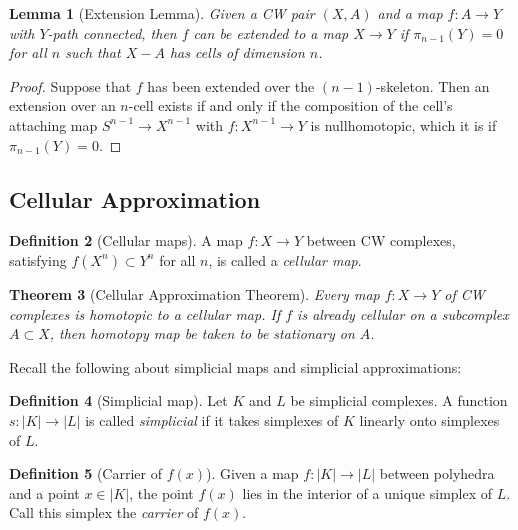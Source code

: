 \documentclass[reqno]{amsart}
\newtheorem{theorem}{Theorem}[section]
\newtheorem{lemma}[theorem]{Lemma}
\theoremstyle{definition}
\newtheorem{definition}[theorem]{Definition}
\theoremstyle{remark}
\begin{document}
\begin{lemma}[Extension Lemma]\label{Extension-Lemma}
    Given a CW pair $\left( X,A \right) $ and a map
    $f \colon A \to Y$ with $Y$-path connected,
    then $f$ can be extended to a map
    $X \to Y$ if $\pi_{n-1}(Y) = 0$ for all $n$ such that
    $X -A$ has cells of dimension $n$.
\end{lemma}

\begin{proof}
    Suppose that $f$ has been extended over the
    $\left( n-1 \right) $-skeleton. Then an extension
    over an $n$-cell exists if and only if
    the composition of the cell's attaching
    map $S^{n-1} \to X^{n-1}$ with $f
    \colon X^{n-1} \to Y$ is nullhomotopic, which
    it is if $\pi_{n-1} (Y) = 0$.
\end{proof}

\subsection{Cellular Approximation}

\begin{definition}[Cellular maps]
    A map $f \colon X \to Y$ between CW complexes,
    satisfying
    $f(X^{n}) \subset Y^{n}$ for all $n$, is called
    a \textit{cellular map}.
\end{definition}

\begin{theorem}[Cellular Approximation Theorem]
    Every map $f \colon X \to Y$ of CW complexes is homotopic
    to a cellular map. If $f$ is already cellular
    on a subcomplex $A \subset X$, then homotopy
    map be taken to be stationary on $A$.
\end{theorem}

Recall the following about simplicial maps and simplicial
approximations:

\begin{definition}[Simplicial map]
    Let $K$ and $L$ be simplicial complexes. A function
    $s \colon \left| K \right| \to \left| L \right| $ 
    is called \textit{simplicial} if it takes simplexes
    of $K$ linearly onto simplexes of $L$.
\end{definition}

\begin{definition}[Carrier of $f(x)$]
    Given a map  $f \colon \left| K \right| 
    \to \left| L \right| $ between polyhedra and a
    point $x \in \left| K \right| $, the point
    $f(x)$ lies in the interior of a unique simplex of
    $L$. Call this simplex the \textit{carrier} of 
    $f(x)$.
\end{definition}
\end{document}
